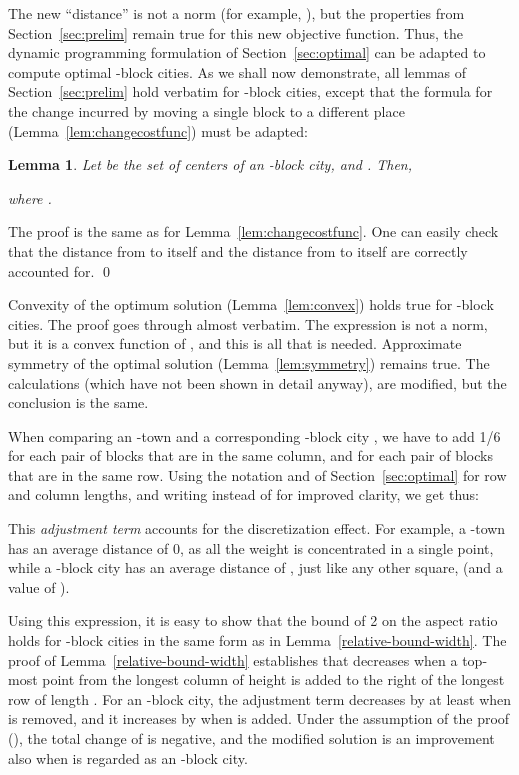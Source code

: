 \documentclass[preprint,authoryear,12pt]{elsarticle}
\newtheorem{lemma}[theorem]{Lemma}
\begin{document}
The new ``distance''  is not a norm (for example, ),
but the properties from Section~\ref{sec:prelim} remain true for this
new objective function.  Thus, the dynamic programming formulation of
Section~\ref{sec:optimal} can be adapted to compute optimal -block
cities.
As we shall now demonstrate,
all lemmas of Section~\ref{sec:prelim} hold verbatim
for -block cities, except that the formula for
the change incurred by moving a single block to a different place
(Lemma~\ref{lem:changecostfunc}) must be adapted:
\begingroup
\renewcommand\thetheorem{\ref{lem:changecostfunc}}
\begin{lemma}
  Let 
be the set of centers of an -block city,  and . Then,

where
.
\end{lemma}
\endgroup
The proof is the same as for
Lemma~\ref{lem:changecostfunc}. One can easily check
that the distance  from  to itself
and the distance from  to itself
are correctly accounted for.
\qed

Convexity of the optimum solution (Lemma~\ref{lem:convex}) holds
true for -block cities. The proof goes through almost verbatim.
The expression  is not a norm, but it is a convex function of
, and this is all that is needed.
Approximate symmetry of the optimal solution (Lemma~\ref{lem:symmetry})
remains true. The calculations (which have not been shown in detail
anyway), are modified, but the conclusion is the same.


When comparing an -town  and a corresponding -block city
, we have to add 1/6 for each pair of blocks that are in the
same column, and for each pair of blocks that are in the same row.
 Using the notation  and  of Section~\ref{sec:optimal}
for row and column lengths,
and writing
 instead of  for improved clarity,
 we get thus:

This {\em adjustment term} accounts for the discretization effect.
For example, a -town has an average distance of 0, as all the weight is
concentrated in a single point, while a -block city has
an average distance of ,
just like any other square,
 (and a  value of ).



Using this expression, it is easy to show that the bound of 2 on the
 aspect ratio holds for -block cities in the same form as in
 Lemma~\ref{relative-bound-width}.
The proof of Lemma~\ref{relative-bound-width} establishes that
 decreases when a top-most point  from the
longest column of height  is added to the right of the
 longest row of length .
For an -block city, the
adjustment term
 decreases by at least  when  is removed,
and it increases by  when  is added.
Under the assumption of the proof (), the total change
of 
is negative, and the modified solution is an improvement also when
 is regarded as an -block city.
\end{document}
